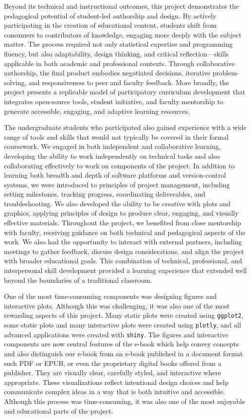 \documentclass[11pt]{article}
\begin{document}
Beyond its technical and instructional outcomes, this project demonstrates the pedagogical potential of student-led authorship and design. By actively participating in the creation of educational content, students shift from consumers to contributors of knowledge, engaging more deeply with the subject matter.
The process required not only statistical expertise and programming fluency, but also adaptability, design thinking, and critical reflection—skills applicable in both academic and professional contexts. Through collaborative authorship, the final product embodies negotiated decisions, iterative problem-solving, and responsiveness to peer and faculty feedback.
More broadly, the project presents a replicable model of participatory curriculum development that integrates open-source tools, student initiative, and faculty mentorship to generate accessible, engaging, and adaptive learning resources.

The undergraduate students who participated also gained experience with a wide range of tools and skills that would not typically be covered in their formal coursework.
We engaged in both independent and collaborative learning, developing the ability to work independently on technical tasks and also collaborating effectively to work on components of the project.
In addition to learning both breadth and depth of software platforms and version-control systems, we were introduced to principles of project management, including setting milestones, tracking progress, coordinating deliverables, and troubleshooting.
We also developed the ability to be creative with plots and graphics, applying principles of design to produce clear, engaging, and visually effective materials.
Throughout the project, we benefited from close mentorship with faculty, receiving guidance on both technical and pedagogical aspects of the work.
We also had the opportunity to interact with external partners, including meetings to gather feedback, discuss design considerations, and align the project with broader educational goals.
This combination of technical, professional, and interpersonal skill development provided a learning experience that extended well beyond the boundaries of a traditional classroom.

One of the most time-consuming components was designing figures and interactive plots. 
Although this was challenging, it was also one of the most rewarding aspects of this project.
Many static plots were created using \texttt{ggplot2}, some static plots and many interactive plots were created using \texttt{plotly}, 
and all advanced applications were created with \texttt{shiny}. 
The figures and interactive components are now central features of the e-book which help convey concepts and also distinguish our e-book from an e-book published in a document format such PDF or EPUB, or even the proprietary digital books offered from a publisher.
They are visually clear, carefully styled, and interactive where appropriate. These visualizations reflect intentional design choices and help communicate complex ideas in a way that is both intuitive and accessible. Although this process was time-consuming, it was also one of the most enjoyable and educational parts of the project.
\end{document}
